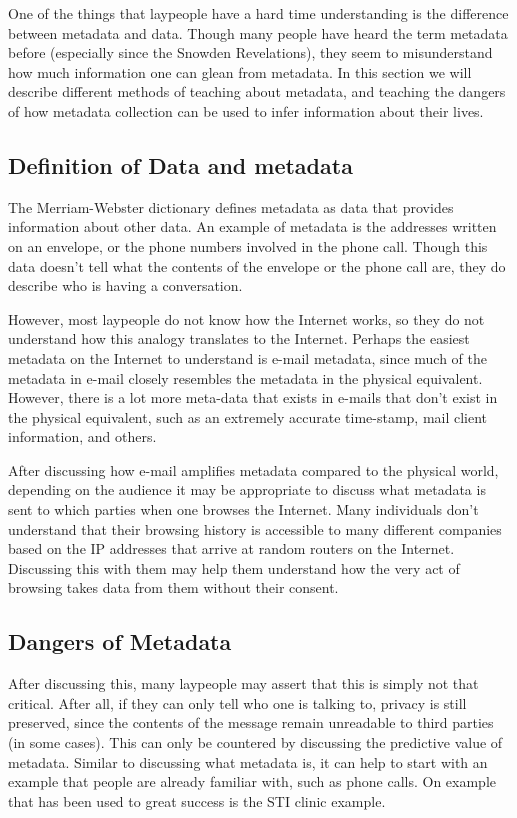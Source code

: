 One of the things that laypeople have a hard time understanding is the difference between metadata and data. Though many people have heard the term metadata before (especially since the Snowden Revelations), they seem to misunderstand how much information one can glean from metadata. In this section we will describe different methods of teaching about metadata, and teaching the dangers of how metadata collection can be used to infer information about their lives.

\subsection{Definition of Data and metadata}

The Merriam-Webster dictionary defines metadata as data that provides information about other data. An example of metadata is the addresses written on an envelope, or the phone numbers involved in the phone call. Though this data doesn't tell what the contents of the envelope or the phone call are, they do describe who is having a conversation.

However, most laypeople do not know how the Internet works, so they do not understand how this analogy translates to the Internet. Perhaps the easiest metadata on the Internet to understand is e-mail metadata, since much of the metadata in e-mail closely resembles the metadata in the physical equivalent. However, there is a lot more meta-data that exists in e-mails that don't exist in the physical equivalent, such as an extremely accurate time-stamp, mail client information, and others.

After discussing how e-mail amplifies metadata compared to the physical world, depending on the audience it may be appropriate to discuss what metadata is sent to which parties when one browses the Internet. Many individuals don't understand that their browsing history is accessible to many different companies based on the IP addresses that arrive at random routers on the Internet. Discussing this with them may help them understand how the very act of browsing takes data from them without their consent.

\subsection{Dangers of Metadata}

After discussing this, many laypeople may assert that this is simply not that critical. After all, if they can only tell who one is talking to, privacy is still preserved, since the contents of the message remain unreadable to third parties (in some cases). This can only be countered by discussing the predictive value of metadata. Similar to discussing what metadata is, it can help to start with an example that people are already familiar with, such as phone calls. On example that has been used to great success is the STI clinic example.

